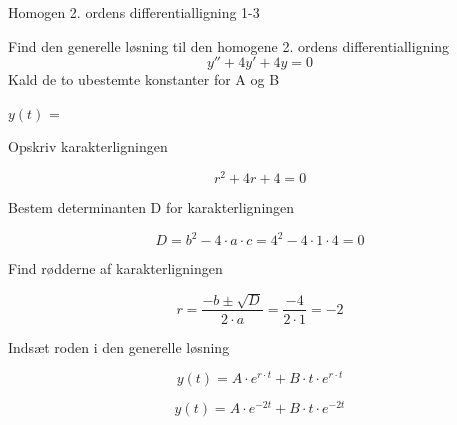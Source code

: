 \documentclass{article}
\begin{document}
\begin{exercise}{Homogen 2. ordens differentialligning 1-3}
	
	Find den generelle løsning til den homogene 2. ordens differentialligning
	\[
	y'' + 4y' + 4y = 0
	\]
	Kald de to ubestemte konstanter for A og B
	
	$y(t)$ = 
	
	
	\hint 
	
	Opskriv karakterligningen
	
	\hint
	
	\[
	r^2 + 4r + 4 = 0
	\]
	
	
	\hint
	
	Bestem determinanten D for karakterligningen
	
	
	\hint 
	\[
	D = b^2 - 4 \cdot a \cdot c = 4^2 - 4 \cdot 1 \cdot 4  = 0
	\]
	
	\hint 
	Find rødderne af karakterligningen
	
	
	\hint
	
	\[
	r = \frac{-b \pm \sqrt{D}}{2 \cdot a} = \frac{-4}{2 \cdot 1} = -2
	\]
	
	\hint
	
	Indsæt roden i den generelle løsning
	
	\hint
	\[
	y(t) = A \cdot e^{r \cdot t} + B \cdot t \cdot e^{r\cdot t}
	\]
	
	\hint
	
	\[
	y(t) = A \cdot e^{-2t} + B \cdot t \cdot e^{-2t}
	\]
	
	
\end{exercise}

\newpage
\end{document}
